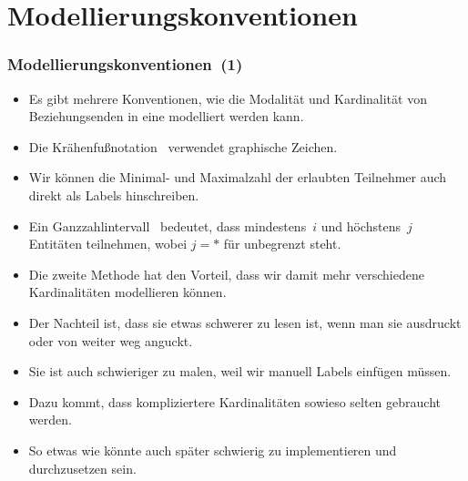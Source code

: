 \documentclass[aspectratio=169,mathserif,notheorems]{beamer}%
\begin{document}
\section{Modellierungskonventionen}%
%
\begin{frame}[t]%
\frametitle{Modellierungskonventionen~(1)}%
\begin{itemize}%
\item Es gibt mehrere Konventionen, wie die Modalität und Kardinalität von Beziehungsenden in eine  modelliert werden kann.%
%
\item<2-> Die Krähenfußnotation~ verwendet graphische Zeichen\cite{E1976BDSMEWACE,CM2000MDMAUDA,S2024D:CDMERDE}.%
%
%
%
\item<4-> Wir können die Minimal- und Maximalzahl der erlaubten Teilnehmer auch direkt als Labels hinschreiben\cite{P2006CITRD:ERMI}.%
%
\item<5-> Ein Ganzzahlintervall~ bedeutet, dass mindestens~$i$ und höchstens~$j$ Entitäten teilnehmen, wobei $j=*$ für unbegrenzt steht.%
%
\item<6-> Die zweite Methode hat den Vorteil, dass wir damit mehr verschiedene Kardinalitäten modellieren können.%
%
\item<7-> Der Nachteil ist, dass sie etwas schwerer zu lesen ist, wenn man sie ausdruckt oder von weiter weg anguckt.%
%
\item<8-> Sie ist auch schwieriger zu malen, weil wir manuell Labels einfügen müssen.%
%
\item<9-> Dazu kommt, dass kompliziertere Kardinalitäten sowieso selten gebraucht werden.%
%
\item<10-> So etwas wie  könnte auch später schwierig zu implementieren und durchzusetzen sein.%
%
\end{itemize}%
%
%
%
%
\end{frame}%
%
\end{document}
